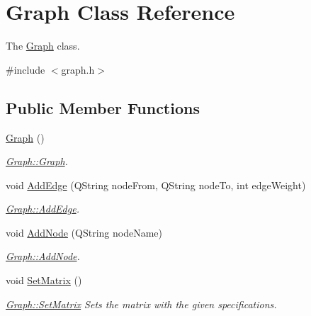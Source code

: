 \hypertarget{class_graph}{}\section{Graph Class Reference}
\label{class_graph}


The \mbox{\hyperlink{class_graph}{Graph}} class.  




{\ttfamily \#include $<$graph.\+h$>$}

\subsection*{Public Member Functions}
\begin{DoxyCompactItemize}
\item 
\mbox{\label{class_graph_ae4c72b8ac4d693c49800a4c7e273654f}} 
\mbox{\hyperlink{class_graph_ae4c72b8ac4d693c49800a4c7e273654f}{Graph}} ()
\begin{DoxyCompactList}\small\item\em \mbox{\hyperlink{class_graph_ae4c72b8ac4d693c49800a4c7e273654f}{Graph\+::\+Graph}}. \end{DoxyCompactList}\item 
void \mbox{\hyperlink{class_graph_a6ad227abe45e368bf6a795f58434f859}{Add\+Edge}} (Q\+String node\+From, Q\+String node\+To, int edge\+Weight)
\begin{DoxyCompactList}\small\item\em \mbox{\hyperlink{class_graph_a6ad227abe45e368bf6a795f58434f859}{Graph\+::\+Add\+Edge}}. \end{DoxyCompactList}\item 
void \mbox{\hyperlink{class_graph_a6fc3cb2886337e235a6f7a417e3d6c62}{Add\+Node}} (Q\+String node\+Name)
\begin{DoxyCompactList}\small\item\em \mbox{\hyperlink{class_graph_a6fc3cb2886337e235a6f7a417e3d6c62}{Graph\+::\+Add\+Node}}. \end{DoxyCompactList}\item 
\mbox{\label{class_graph_a389281c21ce4288c795f303532d0379a}} 
void \mbox{\hyperlink{class_graph_a389281c21ce4288c795f303532d0379a}{Set\+Matrix}} ()
\begin{DoxyCompactList}\small\item\em \mbox{\hyperlink{class_graph_a389281c21ce4288c795f303532d0379a}{Graph\+::\+Set\+Matrix}} Sets the matrix with the given specifications. \end{DoxyCompactList}\item 

\end{DoxyCompactItemize}
